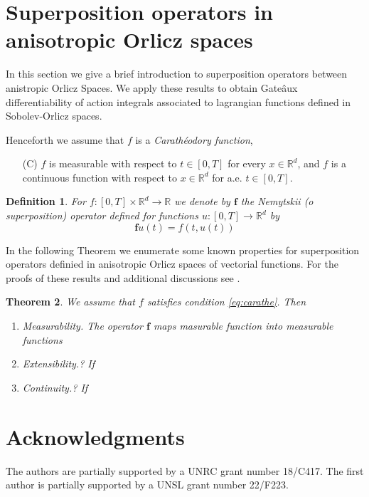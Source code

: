 \documentclass[twoside]{article}
\makeatletter
\newtheorem{thm}{Theorem}[section]
\newtheorem{defi}[thm]{Definition}
\theoremstyle{remark}
\def\namedlabel#1#2{\begingroup
    #2%
    \def\@currentlabel{#2}%
    \phantomsection\label{#1}\endgroup
}
\renewcommand{\b}[1]{\boldsymbol{#1}}
\newcommand{\rr}{\mathbb{R}}
\makeatother
\begin{document}
\section{Superposition operators in anisotropic Orlicz spaces}
In this section we give a brief introduction to superposition operators between anistropic Orlicz Spaces.  We apply these results to obtain Gate\^aux differentiability of                                                                                action integrals associated to lagrangian functions defined in Sobolev-Orlicz spaces.

Henceforth we assume that $f$ is a \emph{Carath\'eodory function},

\begin{enumerate}
 \item[\namedlabel{eq:carathe}{(C)}] $f$ is measurable with respect to $t\in [0,T]$ for every  $x\in\rr^d$, and $f$ is a continuous function with  respect to  $x\in\rr^d$ for a.e. $t \in [0,T]$.
\end{enumerate}




\begin{defi}
 For $f:[0,T]\times \rr^d\to\rr$  we denote by $\b{f}$ the Nemytskii (o superposition) operator defined for functions $u:[0,T]\to\rr^d$ by
\[\b{f}u(t)=f(t,u(t))\]
\end{defi}

In the following Theorem we enumerate  some known properties for superposition operators definied in anisotropic Orlicz spaces of vectorial functions.   For the proofs of these results and additional  discussions see
\cite{zbMATH04038592,zbMATH03983966,zbMATH03942215}.

\begin{thm} We assume that $f$ satisfies condition \eqref{eq:carathe}. Then
\begin{enumerate}
 \item\label{it:measure}\emph{Measurability.}  The operator $\b{f}$ maps  masurable function into measurable functions
 \item\label{it:exten}\emph{Extensibility.?} If
 \item\label{it:exten}\emph{Continuity.?} If

\end{enumerate}




\end{thm}




\section*{Acknowledgments}
The authors are partially supported by a UNRC grant number 18/C417. The first author is  partially supported by a  UNSL grant number 22/F223. 




 
 
\end{document}

